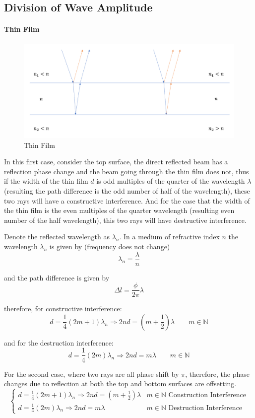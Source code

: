 \documentclass[UTF8]{book}
\begin{document}
\subsection{Division of Wave Amplitude}

\paragraph{Thin Film}
\begin{figure}[H]
\centering
\includegraphics[scale=0.6]{Figure/19.PNG}
\caption{Thin Film}
\end{figure}
In this first case, consider the top surface, the direct reflected beam has a reflection phase change and the beam going through the thin film does not, thus if the width of the thin film $d$ is odd multiples of the quarter of the wavelength $\lambda $ (resulting the path difference is the odd number of half of the wavelength), these two rays will have a constructive interference. And for the case that the width of the thin film is the even multiples of the quarter wavelength (resulting even number of the half wavelength), this two rays will have destructive interference. 

Denote the reflected wavelength as $\lambda _n$. In a medium of refractive index $n$ the wavelength $\lambda _n$ is given by (frequency does not change)
\[\lambda _n=\frac{\lambda }{n}\]

and the path difference is given by
\[\Delta l=\frac{\phi }{2\pi}\lambda\]

therefore, for constructive interference:
\[d = \frac{1}{4}(2m+1)\lambda _n\Rightarrow 2nd=\left(m+\frac{1}{2}\right)\lambda \qquad m\in \mathbb{N}\]

and for the destruction interference:
\[d = \frac{1}{4}(2m)\lambda _n\Rightarrow 2nd=m\lambda \qquad m\in \mathbb{N}\]

For the second case, where two rays are all phase shift by $\pi$, therefore, the phase changes due to reflection at both the top and bottom surfaces are offsetting.
\[\begin{cases}
d = \frac{1}{4}(2m+1)\lambda _n\Rightarrow 2nd=\left(m+\frac{1}{2}\right)\lambda &m\in \mathbb{N} \textrm{ Construction Interference}\\
d = \frac{1}{4}(2m)\lambda _n\Rightarrow 2nd=m\lambda &m\in \mathbb{N} \textrm{ Destruction Interference}
\end{cases}\]
\end{document}

